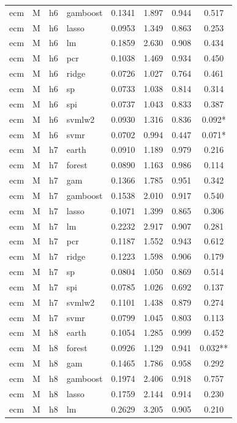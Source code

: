 \begin{ThreePartTable}
\begin{longtable}[t]{llclcccc}
ecm & M & h6 & gamboost & 0.1341 & 1.897 & 0.944 & 0.517\\
ecm & M & h6 & lasso & 0.0953 & 1.349 & 0.863 & 0.253\\
ecm & M & h6 & lm & 0.1859 & 2.630 & 0.908 & 0.434\\
ecm & M & h6 & pcr & 0.1038 & 1.469 & 0.934 & 0.450\\
ecm & M & h6 & ridge & 0.0726 & 1.027 & 0.764 & 0.461\\
ecm & M & h6 & sp & 0.0733 & 1.038 & 0.814 & 0.314\\
ecm & M & h6 & spi & 0.0737 & 1.043 & 0.833 & 0.387\\
ecm & M & h6 & svmlw2 & 0.0930 & 1.316 & 0.836 & 0.092*\\
ecm & M & h6 & svmr & 0.0702 & 0.994 & 0.447 & 0.071*\\
\addlinespace
ecm & M & h7 & earth & 0.0910 & 1.189 & 0.979 & 0.216\\
ecm & M & h7 & forest & 0.0890 & 1.163 & 0.986 & 0.114\\
ecm & M & h7 & gam & 0.1366 & 1.785 & 0.951 & 0.342\\
ecm & M & h7 & gamboost & 0.1538 & 2.010 & 0.917 & 0.540\\
ecm & M & h7 & lasso & 0.1071 & 1.399 & 0.865 & 0.306\\
ecm & M & h7 & lm & 0.2232 & 2.917 & 0.907 & 0.281\\
ecm & M & h7 & pcr & 0.1187 & 1.552 & 0.943 & 0.612\\
ecm & M & h7 & ridge & 0.1223 & 1.598 & 0.906 & 0.179\\
ecm & M & h7 & sp & 0.0804 & 1.050 & 0.869 & 0.514\\
ecm & M & h7 & spi & 0.0785 & 1.026 & 0.692 & 0.137\\
ecm & M & h7 & svmlw2 & 0.1101 & 1.438 & 0.879 & 0.274\\
ecm & M & h7 & svmr & 0.0799 & 1.045 & 0.803 & 0.113\\
\addlinespace
ecm & M & h8 & earth & 0.1054 & 1.285 & 0.999 & 0.452\\
ecm & M & h8 & forest & 0.0926 & 1.129 & 0.941 & 0.032**\\
ecm & M & h8 & gam & 0.1465 & 1.786 & 0.958 & 0.292\\
ecm & M & h8 & gamboost & 0.1974 & 2.406 & 0.918 & 0.757\\
ecm & M & h8 & lasso & 0.1759 & 2.144 & 0.914 & 0.230\\
ecm & M & h8 & lm & 0.2629 & 3.205 & 0.905 & 0.210\\

\end{longtable}
\end{ThreePartTable}
